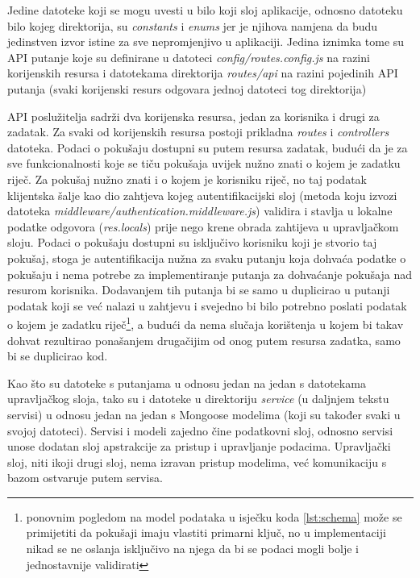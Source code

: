 \documentclass[times, utf8, diplomski, numeric]{fer}
\begin{document}
Jedine datoteke koji se mogu uvesti u bilo koji sloj aplikacije, odnosno datoteku bilo kojeg direktorija, su \emph{constants} i \emph{enums} jer je njihova namjena da budu jedinstven izvor istine  za sve nepromjenjivo u aplikaciji.
Jedina iznimka tome su API putanje koje su definirane u datoteci \emph{config/routes.config.js} na razini korijenskih resursa i datotekama direktorija \emph{routes/api} na razini pojedinih API putanja (svaki korijenski resurs odgovara jednoj datoteci tog direktorija)

API poslužitelja sadrži dva korijenska resursa, jedan za korisnika i drugi za zadatak.
Za svaki od korijenskih resursa postoji prikladna \emph{routes} i \emph{controllers} datoteka.
Podaci o pokušaju dostupni su putem resursa zadatak, budući da je za sve funkcionalnosti koje se tiču pokušaja uvijek nužno znati o kojem je zadatku riječ.
Za pokušaj nužno znati i o kojem je korisniku riječ, no taj podatak klijentska šalje kao dio zahtjeva kojeg  autentifikacijski sloj (metoda koju izvozi datoteka \emph{middleware/authentication.middleware.js}) validira i stavlja u lokalne podatke odgovora (\emph{res.locals}) prije nego krene obrada zahtijeva u upravljačkom sloju.
Podaci o pokušaju dostupni su isključivo korisniku koji je stvorio taj pokušaj, stoga je autentifikacija nužna za svaku putanju koja dohvaća podatke o pokušaju i nema potrebe za implementiranje putanja za dohvaćanje pokušaja nad resurom korisnika. Dodavanjem tih putanja bi se samo u duplicirao u putanji podatak koji se već nalazi u zahtjevu i svejedno bi bilo potrebno poslati podatak o kojem je zadatku riječ\footnote{
    ponovnim pogledom na model podataka u isječku koda \ref{lst:schema} može se primijetiti da pokušaji imaju vlastiti primarni ključ, no u implementaciji nikad se ne oslanja isključivo na njega da bi se podaci mogli bolje i jednostavnije validirati
}, a budući da nema slučaja korištenja u kojem bi takav dohvat rezultirao ponašanjem drugačijim od onog putem resursa zadatka, samo bi se duplicirao kod.

Kao što su datoteke s putanjama u odnosu jedan na jedan s datotekama upravljačkog sloja, tako su i datoteke u direktoriju \emph{service} (u daljnjem tekstu servisi) u odnosu jedan na jedan s Mongoose modelima (koji su također svaki u svojoj datoteci).
Servisi i modeli zajedno čine podatkovni sloj, odnosno servisi unose dodatan sloj apstrakcije za pristup i upravljanje podacima.
Upravljački sloj, niti ikoji drugi sloj, nema izravan pristup modelima, već komunikaciju s bazom ostvaruje putem servisa.
\end{document}
